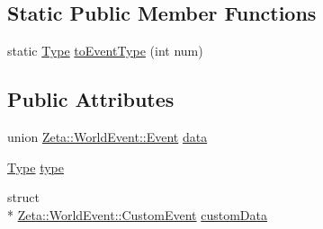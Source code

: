 \subsection*{Static Public Member Functions}
\begin{DoxyCompactItemize}
\item 
static \hyperlink{classZeta_1_1WorldEvent_a92adb82c22c6f59afec5911098f85158}{Type} \hyperlink{classZeta_1_1WorldEvent_ac42425a769a73b6e3c7beb4d9a7846fa}{to\+Event\+Type} (int num)
\end{DoxyCompactItemize}
\subsection*{Public Attributes}
\begin{DoxyCompactItemize}
\item 
union \hyperlink{unionZeta_1_1WorldEvent_1_1Event}{Zeta\+::\+World\+Event\+::\+Event} \hyperlink{classZeta_1_1WorldEvent_ac1d7d4643296098531c46b737eed053d}{data}
\item 
\hyperlink{classZeta_1_1WorldEvent_a92adb82c22c6f59afec5911098f85158}{Type} \hyperlink{classZeta_1_1WorldEvent_a67ce954f9d4c03e0525640125068dfef}{type}
\item 
struct \\*
\hyperlink{structZeta_1_1WorldEvent_1_1CustomEvent}{Zeta\+::\+World\+Event\+::\+Custom\+Event} \hyperlink{classZeta_1_1WorldEvent_af5a8141d88420a5b1422db410719726b}{custom\+Data}
\end{DoxyCompactItemize}


